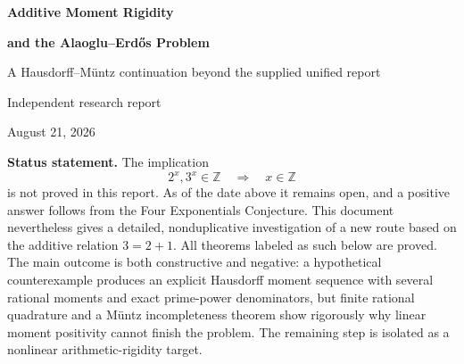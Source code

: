 \documentclass[11pt,oneside]{article}
\theoremstyle{definition}
\theoremstyle{remark}
\newcommand{\Z}{\mathbb Z}
\begin{document}
\hypersetup{pageanchor=false}

\begin{titlepage}
\centering
\vspace*{1.0cm}
{\Huge\bfseries Additive Moment Rigidity\par}
\vspace{0.18cm}
{\Huge\bfseries and the Alaoglu--Erd\H{o}s Problem\par}
\vspace{0.65cm}
{\Large A Hausdorff--M\"untz continuation beyond the supplied unified report\par}
\vspace{1.0cm}
{\large Independent research report\par}
\vspace{0.15cm}
{\large August 21, 2026\par}
\vfill
\begin{minipage}{0.91\textwidth}
\small
\textbf{Status statement.}
The implication
\[
  2^x,3^x\in\Z \quad\Longrightarrow\quad x\in\Z
\]
is not proved in this report.  As of the date above it remains open, and a positive answer
follows from the Four Exponentials Conjecture.  This document nevertheless gives a detailed,
nonduplicative investigation of a new route based on the additive relation $3=2+1$.
All theorems labeled as such below are proved.  The main outcome is both constructive and
negative: a hypothetical counterexample produces an explicit Hausdorff moment sequence with
several rational moments and exact prime-power denominators, but finite rational quadrature and
a M\"untz incompleteness theorem show rigorously why linear moment positivity cannot finish the
problem.  The remaining step is isolated as a nonlinear arithmetic-rigidity target.
\end{minipage}
\vfill
\end{titlepage}
\hypersetup{pageanchor=true}
\end{document}
